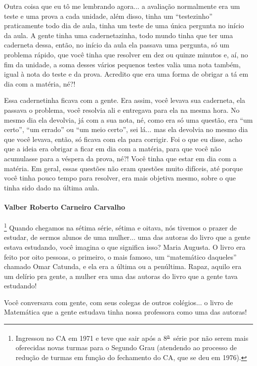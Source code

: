 \documentclass{hipatia}
\newcommand{\superau}{\textsuperscript{\underline{a}}~}
\begin{document}
Outra coisa que eu tô me lembrando agora... a avaliação normalmente era
um teste e uma prova a cada unidade, além disso, tinha um ``testezinho''
praticamente todo dia de aula, tinha um teste de uma única pergunta no
início da aula. A gente tinha uma cadernetazinha, todo mundo tinha que
ter uma caderneta dessa, então, no início da aula ela passava uma
pergunta, só um problema rápido, que você tinha que resolver em dez ou
quinze minutos e, aí, no fim da unidade, a soma desses vários pequenos
testes valia uma nota também, igual à nota do teste e da prova. Acredito
que era uma forma de obrigar a tá em dia com a matéria, né?!

Essa cadernetinha ficava com a gente. Era assim, você levava sua
caderneta, ela passava o problema, você resolvia ali e entregava para
ela na mesma hora. No mesmo dia ela devolvia, já com a sua nota, né,
como era só uma questão, era ``um certo'', ``um errado'' ou ``um meio
certo'', sei lá... mas ela devolvia no mesmo dia que você levava, então,
só ficava com ela para corrigir. Foi o que eu disse, acho que a ideia
era obrigar a ficar em dia com a matéria, para que você não acumulasse
para a véspera da prova, né?! Você tinha que estar em dia com a matéria.
Em geral, essas questões não eram questões muito difíceis, até porque
você tinha pouco tempo para resolver, era mais objetiva mesmo, sobre o
que tinha sido dado na última aula.

\paragraph{Valber Roberto Carneiro Carvalho}\footnote{Ingressou no CA em
  1971 e teve que sair após a 8\superau  série por não serem mais oferecidas
  novas turmas para o Segundo Grau (atendendo ao processo de redução de
  turmas em função do fechamento do CA, que se deu em 1976).}
Quando chegamos na sétima série, sétima e oitava, nós tivemos o prazer
de estudar, de sermos alunos de uma mulher... uma das autoras do livro
que a gente estava estudando, você imagina o que significa isso? Maria
Augusta. O livro era feito por oito pessoas, o primeiro, o mais famoso,
um ``matemático daqueles'' chamado Omar Catunda, e ela era a última ou a
penúltima. Rapaz, aquilo era um delírio pra gente, a mulher era uma das
autoras do livro que a gente tava estudando!

Você conversava com gente, com seus colegas de outros colégios... o
livro de Matemática que a gente estudava tinha nossa professora como uma
das autoras!
\end{document}

